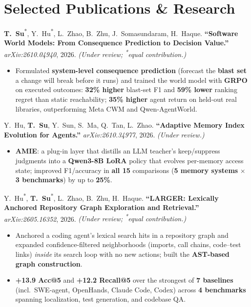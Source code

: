 \documentclass[letterpaper,10pt]{article}
\begin{document}
\section{Selected Publications \& Research}
\vspace{1pt}
\begin{enumerate}[leftmargin=1.3em, itemsep=2pt, topsep=0pt, parsep=0pt, label={[\arabic*]}]
  \item \textbf{T.~Su}\textsuperscript{*}, Y.~Hu\textsuperscript{*}, L.~Zhao, B.~Zhu, J.~Somasundaram, H.~Haque. \textbf{``Software World Models: From
  Consequence Prediction to Decision Value.''} \textit{arXiv:2610.04940}, 2026. \textit{(Under review; \textsuperscript{*}equal contribution.)}
  \begin{itemize}
    \item Formulated \textbf{system-level consequence prediction} (forecast the \textbf{blast set} a change will break before it runs) and trained the
    world model with \textbf{GRPO} on executed outcomes: \textbf{32\% higher} blast-set F1 and \textbf{59\% lower} ranking regret than static reachability;
    \textbf{35\% higher} agent return on held-out real libraries, outperforming Meta CWM and Qwen-AgentWorld.
  \end{itemize}

  \item Y.~Hu, \textbf{T.~Su}, Y.~Sun, S.~Ma, Q.~Tan, L.~Zhao. \textbf{``Adaptive Memory Index Evolution for Agents.''}\newline
  \textit{arXiv:2610.34977}, 2026. \textit{(Under review.)}
  \begin{itemize}
    \item \textbf{AMIE}: a plug-in layer that distills an LLM teacher's keep/suppress judgments into a \textbf{Qwen3-8B LoRA} policy that evolves
    per-memory access state; improved F1/accuracy in \textbf{all 15} comparisons (\textbf{5 memory systems} $\times$ \textbf{3 benchmarks}) by up to \textbf{25\%}.
  \end{itemize}

  \item Y.~Hu\textsuperscript{*}, \textbf{T.~Su}\textsuperscript{*}, L.~Zhao, B.~Zhu, H.~Haque. \textbf{``LARGER: Lexically Anchored
  Repository Graph Exploration and Retrieval.''} \textit{arXiv:2605.16352}, 2026. \textit{(Under review; \textsuperscript{*}equal contribution.)}
  \begin{itemize}
    \item Anchored a coding agent's lexical search hits in a repository graph and expanded confidence-filtered neighborhoods (imports, call
    chains, code--test links) \textit{inside} its search loop with no new actions; built the \textbf{AST-based graph construction}.
    \item \textbf{+13.9 Acc@5} and \textbf{+12.2 Recall@5} over the strongest of \textbf{7 baselines} (incl.\ SWE-agent, OpenHands, Claude Code, Codex)
    across \textbf{4 benchmarks} spanning localization, test generation, and codebase QA.
  \end{itemize}


\end{enumerate}
\end{document}
